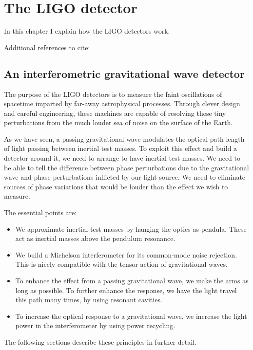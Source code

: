 \chapter{The LIGO detector}
\label{chapter2}

In this chapter I explain how the LIGO detectors work.

Additional references to cite: \cite{Black2003Introduction,Regehr1994Signal}
\section{An interferometric gravitational wave detector}

The purpose of the LIGO detectors is to measure the faint
oscillations of spacetime imparted by far-away astrophysical
processes.  Through clever design and careful engineering, these
machines are capable of resolving these tiny perturbations from the
much louder sea of noise on the surface of the Earth.

As we have seen, a passing gravitational wave modulates the optical
path length of light passing between inertial test
masses.  To exploit this effect and build a detector around it, we
need to arrange to have inertial test masses.  We need to be able to
tell the difference between phase perturbations due to the
gravitational wave and phase perturbations inflicted by our light
source.  We need to eliminate sources of phase variations that would
be louder than the effect we wish to measure.  

The essential points are:
\begin{itemize}
\item We approximate inertial test masses by hanging the optics as
  pendula.  These act as inertial masses above the pendulum resonance.
\item We build a Michelson interferometer for its common-mode noise
  rejection.  This is nicely compatible with the tensor action of
  gravitational waves.
\item To enhance the effect from a passing gravitational wave, we make
  the arms as long as possible.  To further enhance the response, we
  have the light travel this path many times, by using resonant cavities.
\item To increase the optical response to a gravitational wave, we
  increase the light power in the interferometer by using power
  recycling.
\end{itemize}
The following sections describe these principles in further detail.
